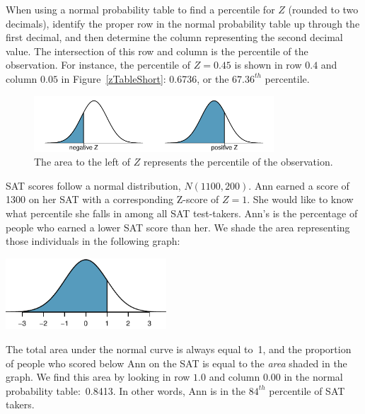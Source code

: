 When using a normal probability table to find a percentile
for $Z$ (rounded to two decimals),
identify the proper row in the normal probability
table up through the first decimal, and then determine the
column representing the second decimal value.
The intersection of this row and column is the percentile
of the observation.
For instance, the percentile of $Z = 0.45$ is shown in row
$0.4$ and column $0.05$ in Figure~\ref{zTableShort}:
0.6736, or the $67.36^{th}$ percentile.

\begin{figure}[h]
  \centering
  \includegraphics[width=0.8\textwidth]
      {ch_distributions/figures/normalTails/normalTails}
  \caption{The area to the left of $Z$ represents the
      percentile of the observation.}
\end{figure}

\begin{examplewrap}
\begin{nexample}{
    SAT scores follow a normal distribution, $N(1100, 200)$.
    Ann earned a score of 1300 on her SAT with
    a corresponding Z-score of $Z = 1$.
    She would like to know what percentile she falls in among
    all SAT test-takers.}
  Ann's  is the percentage of people who
  earned a lower SAT score than her.
  We shade the area representing those individuals in the
  following graph:
  \begin{center}
  \includegraphics[width=0.45\textwidth]
      {ch_distributions/figures/satBelow1300/satBelow1300}
  \end{center}
  The total area under the normal curve is always equal to~1,
  and the proportion of people who scored below Ann on the SAT
  is equal to the \emph{area} shaded in the graph.
  We find this area by looking in row $1.0$ and column $0.00$
  in the normal probability table:~0.8413.
  In other words, Ann is in the $84^{th}$ percentile of
  SAT takers.
\end{nexample}
\end{examplewrap}

